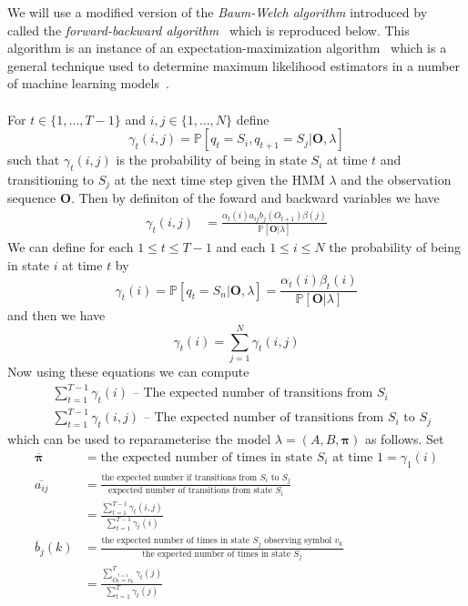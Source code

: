 We will use a modified version of the \emph{Baum-Welch algorithm} introduced by~\citet{baum1970maximization} called the \emph{forward-backward algorithm}~\citep{rabiner1989tutorial} which is reproduced below. This algorithm is an instance of an expectation-maximization algorithm~\citep{moon1996expectation} which is a general technique used to determine maximum likelihood estimators in a number of machine learning models~\citep{bishop2006pattern}. \\
\\
For $t \in \{1, \dots, T-1\}$ and $i,j \in \{1, \dots, N\}$ define
\begin{equation*}
\gamma_t(i,j) = \mathbb{P}[q_t = S_i, q_{t+1}=S_j| \bm{O}, \lambda]
\end{equation*}
such that $\gamma_t(i,j)$ is the probability of being in state $S_i$ at time $t$ and transitioning to $S_j$ at the next time step given the HMM $\lambda$ and the observation sequence $\bm{O}$. Then by definiton of the foward and backward variables we have
\begin{align*}
\gamma_t(i,j) &= \frac{\alpha_t(i)a_{ij}b_j(O_{t+1})\beta(j)}{\mathbb{P}[\bm{O}|\lambda]}	
\end{align*}
We can define for each $1 \leq t \leq T-1$ and each $1 \leq i \leq N$ the probability of being in state $i$ at time $t$ by
\begin{equation*}
\gamma_t(i) = \mathbb{P}[q_t = S_n | \bm{O}, \lambda] = \frac{\alpha_t(i)\beta_t(i)}{\mathbb{P}[\bm{O}|\lambda]}
\end{equation*}
and then we have
\begin{equation*}
\gamma_t(i) = \sum_{j=1}^N \gamma_t(i,j)
\end{equation*}
Now using these equations we can compute
\begin{align*}
&\sum_{t=1}^{T-1} \gamma_t(i) \text{ -- The expected number of transitions from $S_i$} \\
&\sum_{t=1}^{T-1} \gamma_t(i,j) \text{ -- The expected number of transitions from $S_i$ to $S_j$}
\end{align*}
which can be used to reparameterise the model $\lambda = (A,B,\bm{\pi})$ as follows. Set
\begin{align*}
\overline{\bm{\pi}} &= \text{the expected number of times in state $S_i$ at time $1$} = \gamma_1(i) \\
\overline{a_{ij}} &= \frac{\text{the expected number if transitions from $S_i$ to $S_j$}}{\text{expected number of transitions from state $S_i$}} \\ 
				&= \frac{\sum_{t=1}^{T-1} \gamma_t(i,j)}{\sum_{t=1}^{T-1} \gamma_t(i)} \\
\overline{b}_j(k) &= \frac{\text{the expected number of times in state $S_j$ observing symbol $v_k$}}{\text{the expected number of times in state $S_j$}} \\
				&=\frac{\sum_{\stackrel{t=1}{O_t=v_k}}^{T}\gamma_t(j)}{\sum_{t=1}^T \gamma_t(j)}
\end{align*}
